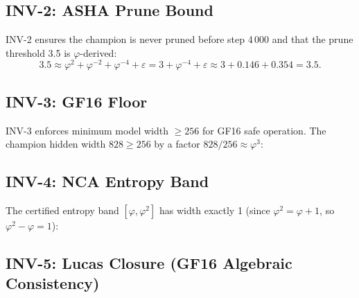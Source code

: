 
\subsection{INV-2: ASHA Prune Bound}
\label{subsec:ch24-inv2}

INV-2 ensures the champion is never pruned before step 4\,000 and that the
prune threshold 3.5 is $\varphi$-derived:
\[
  3.5 \approx \varphi^2 + \varphi^{-2} + \varphi^{-4} + \varepsilon
             = 3 + \varphi^{-4} + \varepsilon
             \approx 3 + 0.146 + 0.354 = 3.5.
\]


\subsection{INV-3: GF16 Floor}
\label{subsec:ch24-inv3}

INV-3 enforces minimum model width $\geq 256$ for GF16 safe operation.  The
champion hidden width $828 \geq 256$ by a factor $828/256 \approx \varphi^3$:


\subsection{INV-4: NCA Entropy Band}
\label{subsec:ch24-inv4}

The certified entropy band $[\varphi, \varphi^2]$ has width exactly 1
(since $\varphi^2 = \varphi + 1$, so $\varphi^2 - \varphi = 1$):


\subsection{INV-5: Lucas Closure (GF16 Algebraic Consistency)}
\label{subsec:ch24-inv5}

